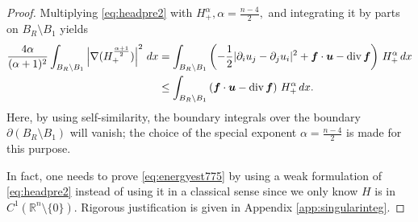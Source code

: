 \documentclass[12pt]{amsart}
\renewcommand{\div}{{\rm div \thinspace }}
\newcommand{\Bu}{{\boldsymbol{u}}}
\newcommand{\Bf}{{\boldsymbol{f}}}
\begin{document}
	\begin{proof}
		Multiplying \eqref{eq:headpre2} with $H^{\alpha}_+, \alpha= \frac{n-4}{2},$ and integrating it by parts on $B_R\setminus B_1$ yields
		\begin{align}
			\label{eq:energyest775}
			\begin{aligned}
				\frac{4\alpha}{(\alpha+1)^2}
				\int _{B_R\setminus B_1}
				\left|
				\nabla (H_+^{\frac{\alpha+1}{2}})
				\right|^2\, dx
				&=
				\int _{B_R\setminus B_1}
				\left(
				-\frac{1}{2} |\partial_i u_j - \partial_j u_i|^2 +\Bf\cdot \Bu - \div  \Bf
				\right) \, H_+^\alpha \, dx
				\\
				&\leq
				\int _{B_R\setminus B_1}
				\left(
				\Bf\cdot \Bu - \div  \Bf
				\right) \, H_+^\alpha \, dx.
			\end{aligned}
		\end{align}
		Here, by using self-similarity, the boundary integrals over the boundary $\partial (B_R\setminus B_1)$ will vanish;  the choice of the special exponent $\alpha= \frac{n-4}{2}$ is made for this purpose. 
		
		In fact, one needs to prove \eqref{eq:energyest775} by using a weak formulation of \eqref{eq:headpre2} instead of using it in a classical sense since we only know $H$ is in $C^1 (\mathbb{R}^n \setminus \{0\})$. Rigorous justification is given in Appendix \ref{app:singularinteg}. 
		

\end{proof}
\end{document}
